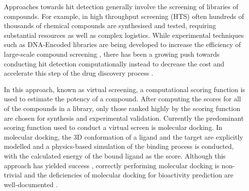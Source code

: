 Approaches towards hit detection generally involve the screening of libraries of compounds. For example, in high throughput screening (HTS) often hundreds of thousands of chemical compounds are synthesised and tested, requiring substantial resources as well as complex logistics. While experimental techniques such as DNA-Encoded libraries are being developed to increase the efficiency of large-scale compound screening \cite{GirondaMartinez2021DNALibrary}, there has been a growing push towards conducting hit detection computationally instead to decrease the cost and accelerate this step of the drug discovery process \cite{?}. 

In this approach, known as virtual screening, a computational scoring function is used to estimate the potency of a compound. After computing the scores for all of the compounds in a library, only those ranked highly by the scoring function are chosen for synthesis and experimental validation. Currently the predominant scoring function used to conduct a virtual screen is molecular docking. In molecular docking, the 3D conformation of a ligand and the target are explicitly modelled and a physics-based simulation of the binding process is conducted, with the calculated energy of the bound ligand as the score. Although this approach has yielded success \cite{Lyu2019UltraLargeDocking,Alon2021SigmaTwo}, correctly performing molecular docking is non-trivial and the deficiencies of molecular docking for bioactivity prediction are well-documented \cite{Llanos2021StrengthsAndWeaknesses, Macip2022HasteMakesWaste}.


